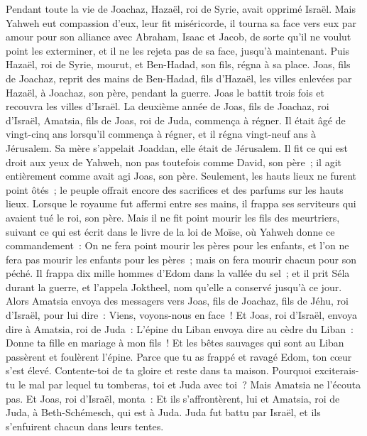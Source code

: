 \begin{multicols}{2}
Pendant toute la vie de Joachaz, Hazaël, roi de Syrie, avait opprimé Israël.
Mais Yahweh eut compassion d'eux, leur fit miséricorde, il tourna sa face vers eux par amour pour son alliance avec Abraham, Isaac et Jacob, de sorte qu'il ne voulut point les exterminer, et il ne les rejeta pas de sa face, jusqu'à maintenant.
Puis Hazaël, roi de Syrie, mourut, et Ben-Hadad, son fils, régna à sa place.
Joas, fils de Joachaz, reprit des mains de Ben-Hadad, fils d'Hazaël, les villes enlevées par Hazaël, à Joachaz, son père, pendant la guerre. Joas le battit trois fois et recouvra les villes d'Israël.
\VerseOne{}La deuxième année de Joas, fils de Joachaz, roi d'Israël, Amatsia, fils de Joas, roi de Juda, commença à régner.
Il était âgé de vingt-cinq ans lorsqu'il commença à régner, et il régna vingt-neuf ans à Jérusalem. Sa mère s'appelait Joaddan, elle était de Jérusalem.
Il fit ce qui est droit aux yeux de Yahweh, non pas toutefois comme David, son père~; il agit entièrement comme avait agi Joas, son père.
Seulement, les hauts lieux ne furent point ôtés~; le peuple offrait encore des sacrifices et des parfums sur les hauts lieux.
Lorsque le royaume fut affermi entre ses mains, il frappa ses serviteurs qui avaient tué le roi, son père.
Mais il ne fit point mourir les fils des meurtriers, suivant ce qui est écrit dans le livre de la loi de Moïse, où Yahweh donne ce commandement~: On ne fera point mourir les pères pour les enfants, et l'on ne fera pas mourir les enfants pour les pères~; mais on fera mourir chacun pour son péché.
Il frappa dix mille hommes d'Edom dans la vallée du sel~; et il prit Séla durant la guerre, et l'appela Joktheel, nom qu'elle a conservé jusqu'à ce jour.
Alors Amatsia envoya des messagers vers Joas, fils de Joachaz, fils de Jéhu, roi d'Israël, pour lui dire~: Viens, voyons-nous en face~!
Et Joas, roi d'Israël, envoya dire à Amatsia, roi de Juda~: L'épine du Liban envoya dire au cèdre du Liban~: Donne ta fille en mariage à mon fils~! Et les bêtes sauvages qui sont au Liban passèrent et foulèrent l'épine.
Parce que tu as frappé et ravagé Edom, ton cœur s'est élevé. Contente-toi de ta gloire et reste dans ta maison. Pourquoi exciterais-tu le mal par lequel tu tomberas, toi et Juda avec toi~?
Mais Amatsia ne l'écouta pas. Et Joas, roi d'Israël, monta~: Et ils s'affrontèrent, lui et Amatsia, roi de Juda, à Beth-Schémesch, qui est à Juda.
Juda fut battu par Israël, et ils s'enfuirent chacun dans leurs tentes.

\end{multicols}
